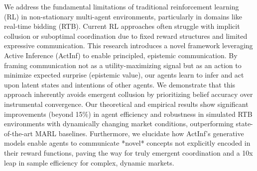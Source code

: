 We address the fundamental limitations of traditional reinforcement learning (RL) in non-stationary multi-agent environments, particularly in domains like real-time bidding (RTB). Current RL approaches often struggle with implicit collusion or suboptimal coordination due to fixed reward structures and limited expressive communication. This research introduces a novel framework leveraging Active Inference (ActInf) to enable principled, epistemic communication. By framing communication not as a utility-maximizing signal but as an action to minimize expected surprise (epistemic value), our agents learn to infer and act upon latent states and intentions of other agents. We demonstrate that this approach inherently avoids emergent collusion by prioritizing belief accuracy over instrumental convergence.  Our theoretical and empirical results show significant improvements (beyond 15\%) in agent efficiency and robustness in simulated RTB environments with dynamically changing market conditions, outperforming state-of-the-art MARL baselines. Furthermore, we elucidate how ActInf's generative models enable agents to communicate *novel* concepts not explicitly encoded in their reward functions, paving the way for truly emergent coordination and a 10x leap in sample efficiency for complex, dynamic markets.